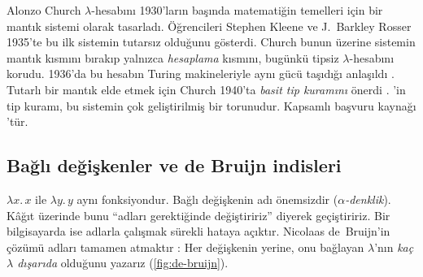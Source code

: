\begin{tarihce}
Alonzo Church $\lambda$-hesabını 1930'ların başında matematiğin temelleri
için bir mantık sistemi olarak tasarladı. Öğrencileri Stephen Kleene ve
J.~Barkley Rosser 1935'te bu ilk sistemin tutarsız olduğunu gösterdi.
Church bunun üzerine sistemin mantık kısmını bırakıp yalnızca
\emph{hesaplama} kısmını, bugünkü tipsiz $\lambda$-hesabını korudu. 1936'da
bu hesabın Turing makineleriyle aynı gücü taşıdığı anlaşıldı
\citep{turing1936}. Tutarlı bir mantık elde etmek için Church 1940'ta
\emph{basit tip kuramını} önerdi \citep{church1940}. \Lean{}'in tip kuramı,
bu sistemin çok geliştirilmiş bir torunudur. Kapsamlı başvuru kaynağı
\citet{barendregt1984}'tür.
\end{tarihce}

\subsection{Bağlı değişkenler ve de Bruijn indisleri}

$\lambda x.\, x$ ile $\lambda y.\, y$ aynı fonksiyondur. Bağlı
değişkenin adı önemsizdir (\emph{$\alpha$-denklik}). Kâğıt üzerinde bunu
``adları gerektiğinde değiştiririz'' diyerek geçiştiririz. Bir
bilgisayarda ise adlarla çalışmak sürekli hataya açıktır. Nicolaas
de~Bruijn'in çözümü adları tamamen atmaktır \citep{debruijn1972}: Her
değişkenin yerine, onu bağlayan $\lambda$'nın \emph{kaç $\lambda$ dışarıda}
olduğunu yazarız (\cref{fig:de-bruijn}).

